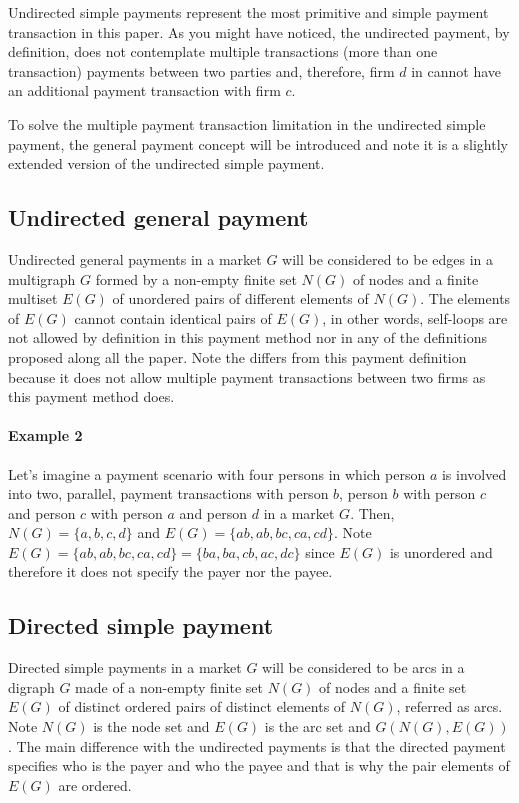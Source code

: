 \documentclass[12pt]{article}
\begin{document}
\begin{multicols}{2}
Undirected simple payments represent the most primitive and simple payment transaction in this paper. As you might have noticed, the undirected payment, by definition,  does not contemplate multiple transactions (more than one transaction) payments between two parties and, therefore, firm $d$ in   cannot have an additional payment transaction with firm $c$. 

To solve the multiple payment transaction limitation in the undirected simple payment, the general payment concept will be introduced and note it is a slightly extended version of the undirected simple payment.

\subsection{Undirected general payment} \label{ugp}
Undirected general payments in a market $G$ will be considered to be edges in a multigraph $G$ formed by a non-empty finite set $N(G)$ of nodes and a finite multiset $E(G)$ of unordered pairs of different elements of $N(G)$. The elements of $E(G)$ cannot contain identical pairs of $E(G)$, in other words,  self-loops are not allowed by definition in this payment method nor in any of the definitions proposed along all the paper. Note the  differs from this payment definition because it does not allow multiple payment transactions between two firms as this payment method does.

\begin{mdframed}
\paragraph{Example 2} \label{ex2}
Let's imagine a payment scenario with four persons in which person $a$ is involved into two, parallel, payment transactions with person $b$, person $b$ with person $c$ and person $c$ with person $a$ and person $d$ in a market $G$. Then, $N(G) = \{a, b, c, d\}$ and $E(G) = \{ab, ab, bc, ca, cd\}$. Note $E(G) = \{ab, ab, bc, ca, cd\} = \{ba, ba, cb, ac, dc\}$ since $E(G)$ is unordered and therefore it does not specify the payer nor the payee.
\end{mdframed}

\subsection{Directed simple payment} \label{dsp}
Directed simple payments in a market $G$ will be considered to be arcs in a digraph $G$ made of a non-empty finite set $N(G)$ of nodes and a finite set $E(G)$ of distinct ordered pairs of distinct elements of $N(G)$, referred as arcs. Note $N(G)$ is the node set and $E(G)$ is the arc set and $G(N(G), E(G))$. The main difference with the undirected payments is that the directed payment specifies who is the payer and who the payee and that is why the pair elements of $E(G)$ are ordered.



\end{multicols}
\end{document}
